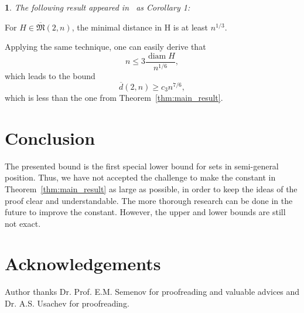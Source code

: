 \documentclass[11pt,twoside,draft
]{article}
\newtheorem{Remark}{\indent {\sc Remark}}
\begin{document}
\begin{Remark}
	The following result appeared in~\cite{solymosi2003note} as Corollary 1:
\end{Remark}

\begin{lemma}
	For $H \in \overline {\mathfrak{M}}(2,n)$, the minimal
	distance in H is at least $n^{1/3}$.
\end{lemma}
Applying the same technique, one can easily derive that
\begin{equation}
	n \leq 3 \frac{\operatorname{diam} H }{n^{1/6}}
	,
\end{equation}
which leads to the bound
\begin{equation}
	\overline{d}(2,n) \geq c_3 n^{7/6}
	,
\end{equation}
which is less than the one from Theorem~\ref{thm:main_result}.


\section{Conclusion}
The presented bound is the first special lower bound for sets in semi-general position.
Thus, we have not accepted the challenge to make the constant in Theorem~\ref{thm:main_result} as large as possible,
in order to keep the ideas of the proof clear and understandable.
The more thorough research can be done in the future to improve the constant.
However, the upper and lower bounds are still not exact.

\section{Acknowledgements}
Author thanks Dr. Prof. E.M. Semenov for proofreading and valuable advices and Dr. A.S. Usachev for proofreading.













\label{end}
\end{document}
